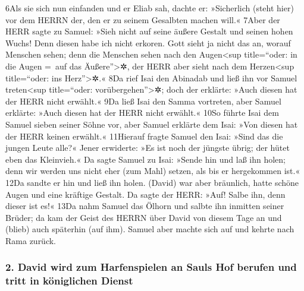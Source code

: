6Als sie sich nun einfanden und er Eliab sah, dachte er: »Sicherlich
(steht hier) vor dem HERRN der, den er zu seinem Gesalbten machen will.«
7Aber der HERR sagte zu Samuel: »Sieh nicht auf seine äußere Gestalt und
seinen hohen Wuchs! Denn diesen habe ich nicht erkoren. Gott sieht ja
nicht das an, worauf Menschen sehen; denn die Menschen sehen nach den
Augen\textless sup title=``oder: in die Augen =~auf das
Äußere''\textgreater✲, der HERR aber sieht nach dem Herzen\textless sup
title=``oder: ins Herz''\textgreater✲.« 8Da rief Isai den Abinadab und
ließ ihn vor Samuel treten\textless sup title=``oder:
vorübergehen''\textgreater✲; doch der erklärte: »Auch diesen hat der
HERR nicht erwählt.« 9Da ließ Isai den Samma vortreten, aber Samuel
erklärte: »Auch diesen hat der HERR nicht erwählt.« 10So führte Isai dem
Samuel sieben seiner Söhne vor, aber Samuel erklärte dem Isai: »Von
diesen hat der HERR keinen erwählt.« 11Hierauf fragte Samuel den Isai:
»Sind das die jungen Leute alle?« Jener erwiderte: »Es ist noch der
jüngste übrig; der hütet eben das Kleinvieh.« Da sagte Samuel zu Isai:
»Sende hin und laß ihn holen; denn wir werden uns nicht eher (zum Mahl)
setzen, als bis er hergekommen ist.« 12Da sandte er hin und ließ ihn
holen. (David) war aber bräunlich, hatte schöne Augen und eine kräftige
Gestalt. Da sagte der HERR: »Auf! Salbe ihn, denn dieser ist es!« 13Da
nahm Samuel das Ölhorn und salbte ihn inmitten seiner Brüder; da kam der
Geist des HERRN über David von diesem Tage an und (blieb) auch späterhin
(auf ihm). Samuel aber machte sich auf und kehrte nach Rama zurück.

\hypertarget{david-wird-zum-harfenspielen-an-sauls-hof-berufen-und-tritt-in-kuxf6niglichen-dienst}{%
\subsubsection{2. David wird zum Harfenspielen an Sauls Hof berufen und
tritt in königlichen
Dienst}\label{david-wird-zum-harfenspielen-an-sauls-hof-berufen-und-tritt-in-kuxf6niglichen-dienst}}

